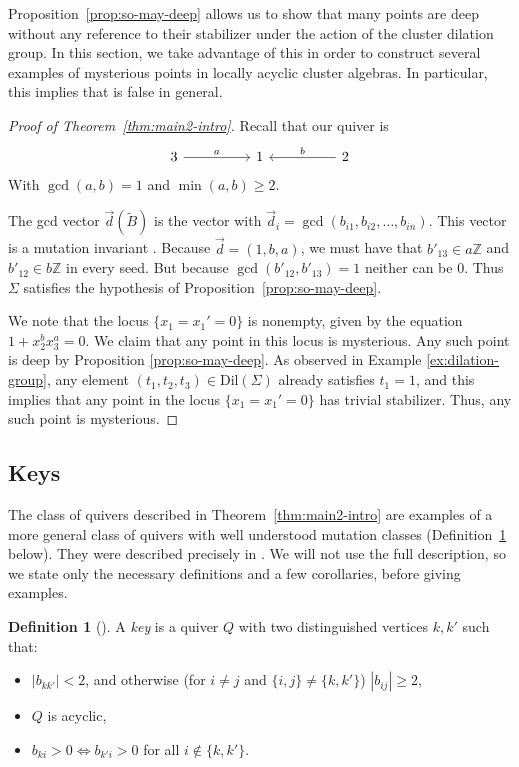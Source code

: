 \documentclass{amsart}
\newcommand{\seed}{\Sigma}
\newcommand{\exmatrix}[1]{\widetilde{#1}}
\numberwithin{equation}{section}
\theoremstyle{definition}
\newtheorem{definition}[theorem]{Definition}
\newcommand{\dil}{\mathrm{Dil}}
\begin{document}
Proposition~\ref{prop:so-may-deep} allows us to show that many points are deep without any reference to their stabilizer under the action of the cluster dilation group. In this section, we take advantage of this in order to construct several examples of mysterious points in locally acyclic cluster algebras.  In particular, this implies that \cite[Conjecture 1.1]{deep} is false in general.

\begin{proof}[Proof of Theorem~\ref{thm:main2-intro}]
Recall that our quiver is
\[\begin{tikzcd}
	3 && 1 && 2
	\arrow["a", from=1-1, to=1-3] 
	\arrow["b"', from=1-5, to=1-3] 
\end{tikzcd}\]
With $\gcd(a,b)=1$ and $\min(a,b) \geq 2$.

The gcd vector $\vec d(\exmatrix{B})$ is the vector with $\vec d_i = \gcd(b_{i1}, b_{i2}, \ldots, b_{in})$. This vector is a mutation invariant \cite{SevenGCD}. %
Because $\vec d = (1,b,a)$, we must have that $b'_{13} \in a \mathbb Z$ and  $b'_{12} \in b \mathbb Z$ in every seed.
But because $\gcd (b'_{12}, b'_{13}) = 1$ neither can be $0$. 
Thus $\seed$ satisfies the hypothesis of Proposition~\ref{prop:so-may-deep}. 

We note that the locus $\{x_1 = x_1' = 0\}$ is nonempty, given by the equation $1 + x_2^bx_3^a = 0$. 
We claim that any point in this locus is mysterious. 
Any such point is deep by Proposition \ref{prop:so-may-deep}. As observed in Example \ref{ex:dilation-group}, any element $(t_1, t_2, t_3) \in \dil(\seed)$ already satisfies $t_1 = 1$, and this implies that any point in the locus $\{x_1 = x_1' = 0\}$ has trivial stabilizer. Thus, any such point is mysterious.
\end{proof}


\subsection{Keys} \label{subsec:keys}
The class of quivers described in Theorem~\ref{thm:main2-intro} are examples of a more general class of quivers with well understood mutation classes (Definition~\ref{def:keys} below). 
They were described precisely in \cite{Ervin}. 
We will not use the full description, so we state only the necessary definitions and a few corollaries, before giving examples.

\begin{definition}[{\cite[Definition~4.1]{Ervin}}]\label{def:keys}
A \emph{key} is a quiver $Q$ with two distinguished vertices $k,k'$ such that:
\begin{itemize}
    \item $|b_{kk'}| < 2$, and otherwise (for $i \neq j$ and $\{i,j\} \neq \{k,k'\}$) $|b_{ij}| \geq 2$, 
    \item $Q$ is acyclic,
    \item $b_{ki} > 0 \iff b_{k'i} > 0$ for all $i \not \in \{k,k'\}$.
\end{itemize}
\end{definition}
\end{document}
